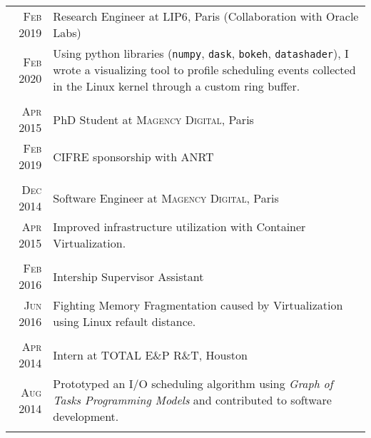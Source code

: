 \documentclass[a4paper,10pt]{article} %
\begin{document}
\begin{tabular}{r|p{11cm}}


\textsc{Feb 2019} & Research Engineer at \textsc{LIP6}, Paris (Collaboration with Oracle Labs)\\
\textsc{Feb 2020}  & \footnotesize{
Using python libraries (\texttt{numpy}, \texttt{dask}, \texttt{bokeh}, \texttt{datashader}),
I wrote a visualizing tool to profile scheduling events collected in the Linux kernel through a custom ring buffer.
}\\
\multicolumn{2}{c}{} \\

\textsc{Apr 2015} & PhD Student at \textsc{Magency Digital}, Paris\\
\textsc{Feb 2019}  & \footnotesize{CIFRE sponsorship with ANRT}\\
\multicolumn{2}{c}{} \\

\textsc{Dec 2014} & Software Engineer at \textsc{Magency Digital}, Paris\\
\textsc{Apr 2015} & \footnotesize{Improved infrastructure utilization with Container Virtualization.}\\
\multicolumn{2}{c}{} \\


\textsc{Feb 2016} & Intership Supervisor Assistant\\
\textsc{Jun 2016} & \footnotesize{Fighting Memory Fragmentation caused by Virtualization using Linux refault distance.}\\
\multicolumn{2}{c}{} \\


\textsc{Apr 2014} & Intern at \textsc{TOTAL E\&P R\&T}, Houston\\
\textsc{Aug 2014} & \footnotesize{Prototyped an I/O scheduling algorithm using \emph{Graph of Tasks Programming Models} and contributed to software development.}\\
\multicolumn{2}{c}{} \\



\end{tabular}
\end{document}

